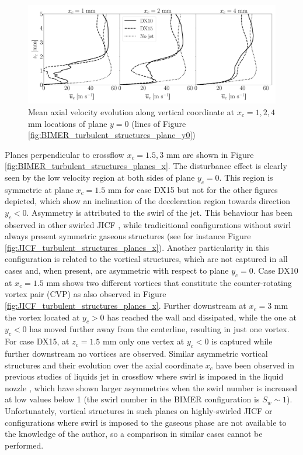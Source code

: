 \begin{figure}[ht]
\centering
   \includegraphics[scale=0.24]{./part3_applications/figures_ch8_resolved/turbulent_structures/lines_y0_along_z_ux_mean}
\caption{Mean axial velocity evolution along vertical coordinate at $x_c = 1, 2, 4$ mm locations of plane $y = 0$ (lines of Figure \ref{fig:BIMER_turbulent_structures_plane_y0})}
\label{fig:BIMER_sps_lines_y0_along_z_ux_mean}
\end{figure}


Planes perpendicular to crossflow $x_c = 1.5, 3$ mm are shown in Figure \ref{fig:BIMER_turbulent_structures_planes_x}. The disturbance effect is clearly seen by the low velocity region at both sides of plane $y_c = 0$. This region is symmetric at plane $x_c = 1.5$ mm for case DX15 but not for the other figures depicted, which show an inclination of the deceleration region towards direction $y_c < 0$. Asymmetry is attributed to the swirl of the jet.  This behaviour has been observed in other swirled JICF , while tradicitional configurations without swirl always present symmetric gaseous structures (see for instance Figure \ref{fig:JICF_turbulent_structures_planes_x}). Another particularity in this configuration is related to the vortical structures, which are not captured in all cases and, when present, are asymmetric with respect to plane $y_c = 0$. Case DX10 at $x_c = 1.5$ mm shows two different vortices that constitute the counter-rotating vortex pair (CVP) as also observed in Figure \ref{fig:JICF_turbulent_structures_planes_x}. Further downstream at $x_c = 3$ mm the vortex located at $y_c > 0$ has reached the wall and dissipated, while the one at $y_c < 0$ has moved further away from the centerline, resulting in just one vortex. For case DX15, at $z_c = 1.5$ mm only one vertex at $y_c < 0$ is captured while further downstream no vortices are observed. Similar asymmetric vortical structures and their evolution over the axial coordinate $x_c$ have been observed in previous studies of liquids jet in crossflow where swirl is imposed in the liquid nozzle , which have shown larger asymmetries when the swirl number is increased at low values below 1 (the swirl number in the BIMER configuration is $S_w \sim 1$). Unfortunately, vortical structures in such planes on highly-swirled JICF or configurations where swirl is imposed to the gaseous phase are not available to the knowledge of the author, so a comparison in similar cases cannot be performed.

